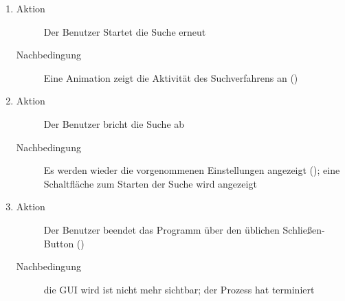\begin{description}
\begin{enumerate}
\begin{description}
		\end{description}
		\item
		\begin{description}
			\item[Aktion] Der Benutzer Startet die Suche erneut
			\item[Nachbedingung] Eine Animation zeigt die Aktivität des Suchverfahrens an ()
		\end{description}
		\item
		\begin{description}
			\item[Aktion] Der Benutzer bricht die Suche ab
			\item[Nachbedingung] Es werden wieder die vorgenommenen Einstellungen angezeigt (); eine Schaltfläche zum Starten der Suche wird angezeigt
		\end{description}
		\item
		\begin{description}
			\item[Aktion] Der Benutzer beendet das Programm über den üblichen Schließen-Button ()
			\item[Nachbedingung] die GUI wird ist nicht mehr sichtbar; der Prozess hat terminiert
		\end{description}
	\end{enumerate}


\end{description}
